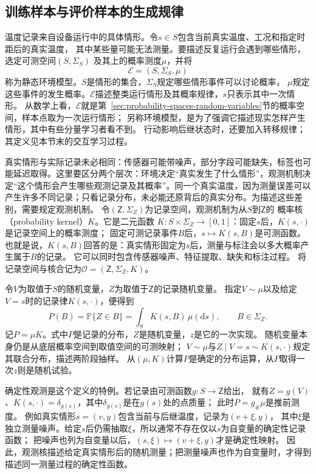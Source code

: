 \subsection{训练样本与评价样本的生成规律}
\label{sec:future-learning-data-objects}

温度记录来自设备运行中的具体情形。令$s\in S$包含当前真实温度、工况和指定时距后的真实温度，
其中某些量可能无法测量。要描述反复运行会遇到哪些情形，选定可测空间$(S,\Sigma_S)$
及其上的概率测度$\mu$，并将
\begin{equation}
  \mathcal E=(S,\Sigma_S,\mu)
  \label{eq:future-static-environment}
\end{equation}
称为静态环境模型。$S$是情形的集合，$\Sigma_S$规定哪些情形事件可以讨论概率，
$\mu$规定这些事件的发生概率。$\mathcal E$描述整类运行情形及其概率规律，$s$只表示其中一次情形。
从数学上看，$\mathcal E$就是第~\ref{sec:probability-spaces-random-variables}节的概率空间，样本点取为一次运行情形；
另称环境模型，是为了强调它描述现实怎样产生情形，其中有些分量学习者看不到。
行动影响后继状态时，还要加入转移规律；其定义见本节末的交互学习过程。

真实情形与实际记录未必相同：传感器可能带噪声，部分字段可能缺失，标签也可能延迟取得。这里要区分两个层次：环境决定“真实发生了什么情形”，观测机制决定“这个情形会产生哪些观测记录及其概率”。同一个真实温度，因为测量误差可以产生许多不同记录；只看记录分布，未必能还原背后的真实分布。为描述这些差别，需要规定观测机制。
令$(\mathsf Z,\Sigma_Z)$为记录空间，观测机制为从$S$到$\mathsf Z$的
概率核（probability kernel）$K$。它是二元函数
$K:S\times\Sigma_Z\to[0,1]$：固定$s$后，$K(s,\cdot)$是记录空间上的概率测度；
固定可测记录事件$B$后，$s\mapsto K(s,B)$是可测函数。
也就是说，$K(s,B)$回答的是：真实情形固定为$s$后，测量与标注会以多大概率产生属于$B$的记录。
它可以同时包含传感器噪声、特征提取、缺失和标注过程。
将记录空间与核合记为$\mathcal O=(\mathsf Z,\Sigma_Z,K)$。

令$V$为取值于$S$的随机变量，$Z$为取值于$\mathsf Z$的记录随机变量。
指定$V\sim\mu$以及给定$V=s$时的记录律$K(s,\cdot)$，便得到
\begin{equation}
  P(B)=\mathbb P\{Z\in B\}
      =\int_S K(s,B)\,\mu(\mathrm ds),
  \qquad B\in\Sigma_Z.
  \label{eq:future-observation-law}
\end{equation}
记$P=\mu K$。式中$P$是记录的分布，$Z$是随机变量，$z$是它的一次实现。
随机变量本身仍是从底层概率空间到取值空间的可测映射；
$V\sim\mu$与$Z\mid V=s\sim K(s,\cdot)$规定其联合分布，描述两阶段抽样。
从$(\mu,K)$计算$P$是确定的分布运算，从$P$取得一次$z$则是随机试验。

确定性观测是这个定义的特例。若记录由可测函数$g:S\to\mathsf Z$给出，
就有$Z=g(V)$、$K(s,\cdot)=\delta_{g(s)}$，其中$\delta_{g(s)}$是在$g(s)$处的点质量；
此时$P=g_{\#}\mu$是推前测度。
例如真实情形$s=(v,y)$包含当前与后继温度，记录为$(v+\xi,y)$，
其中$\xi$是独立测量噪声。给定$s$后仍需抽取$\xi$，所以通常不存在仅以$s$为自变量的确定性记录函数；
把噪声也列为自变量以后，$(s,\xi)\mapsto(v+\xi,y)$才是确定性映射。
因此，观测核描述给定真实情形后的随机测量；把测量噪声也作为自变量时，才得到描述同一测量过程的确定性函数。

